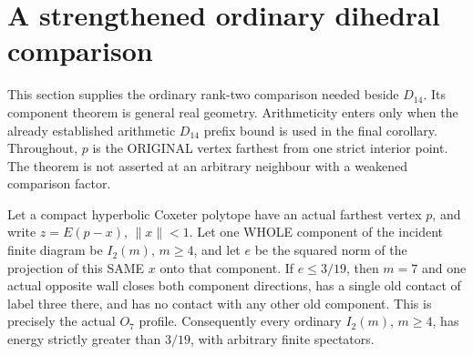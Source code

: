 \section{A strengthened ordinary dihedral comparison}
\label{app:arithdihedral}

This section supplies the ordinary rank-two comparison needed beside
\(D_{14}\).  Its component theorem is general real geometry.
Arithmeticity enters only when the already established arithmetic
\(D_{14}\) prefix bound is used in the final corollary.
Throughout, \(p\) is the ORIGINAL vertex farthest from one strict
interior point.  The theorem is not asserted at an arbitrary
neighbour with a weakened comparison factor.

\begin{proposition}\label{prop:ordinarydihedralthreenineteenths}
Let a compact hyperbolic Coxeter polytope have an actual farthest
vertex \(p\), and write \(z=E(p-x)\), \(\|x\|<1\).
Let one WHOLE component of the incident finite diagram be
\(I_2(m)\), \(m\ge4\), and let \(e\) be the squared norm of the
projection of this SAME \(x\) onto that component.
If \(e\le3/19\), then \(m=7\) and one actual opposite wall
closes both component directions, has a single old contact of
label three there, and has no contact with any other old component.
This is precisely the actual \(O_7\) profile.
Consequently every ordinary \(I_2(m)\), \(m\ge4\), has energy
strictly greater than \(3/19\), with arbitrary finite spectators.
\end{proposition}

